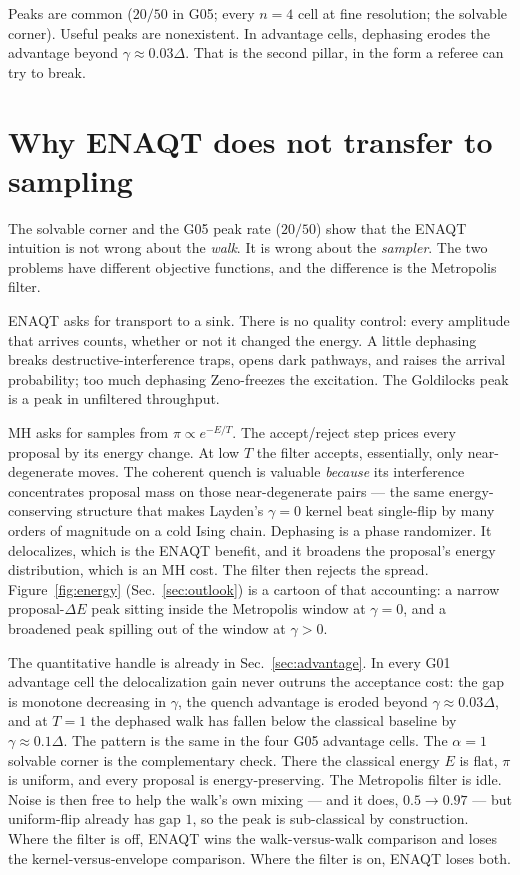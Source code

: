 \documentclass[aps,prx,reprint,floatfix,amsmath,amssymb,amsfonts]{revtex4-2}
\begin{document}
Peaks are common ($20/50$ in G05; every $n=4$ cell at fine resolution;
the solvable corner). Useful peaks are nonexistent. In advantage cells,
dephasing erodes the advantage beyond $\gamma\approx 0.03\Delta$. That
is the second pillar, in the form a referee can try to break.

\section{Why ENAQT does not transfer to sampling}
\label{sec:mechanism}

The solvable corner and the G05 peak rate ($20/50$) show that the ENAQT
intuition is not wrong about the \emph{walk}. It is wrong about the
\emph{sampler}. The two problems have different objective functions, and
the difference is the Metropolis filter.

ENAQT asks for transport to a sink. There is no quality control: every
amplitude that arrives counts, whether or not it changed the energy. A
little dephasing breaks destructive-interference traps, opens dark
pathways, and raises the arrival probability; too much dephasing
Zeno-freezes the excitation. The Goldilocks peak is a peak in unfiltered
throughput.

MH asks for samples from $\pi \propto e^{-E/T}$. The accept/reject step
prices every proposal by its energy change. At low $T$ the filter
accepts, essentially, only near-degenerate moves. The coherent quench is
valuable \emph{because} its interference concentrates proposal mass on
those near-degenerate pairs --- the same energy-conserving structure
that makes Layden's $\gamma=0$ kernel beat single-flip by many orders of
magnitude on a cold Ising chain. Dephasing is a phase randomizer. It
delocalizes, which is the ENAQT benefit, and it broadens the proposal's
energy distribution, which is an MH cost. The filter then rejects the
spread. Figure~\ref{fig:energy} (Sec.~\ref{sec:outlook}) is a cartoon of
that accounting: a narrow proposal-$\Delta E$ peak sitting inside the
Metropolis window at $\gamma=0$, and a broadened peak spilling out of
the window at $\gamma>0$.

The quantitative handle is already in Sec.~\ref{sec:advantage}. In every
G01 advantage cell the delocalization gain never outruns the acceptance
cost: the gap is monotone decreasing in $\gamma$, the quench advantage
is eroded beyond $\gamma\approx 0.03\Delta$, and at $T=1$ the dephased
walk has fallen below the classical baseline by $\gamma\approx 0.1\Delta$.
The pattern is the same in the four G05 advantage cells. The $\alpha=1$
solvable corner is the complementary check. There the classical energy
$E$ is flat, $\pi$ is uniform, and every proposal is energy-preserving.
The Metropolis filter is idle. Noise is then free to help the walk's own
mixing --- and it does, $0.5\to 0.97$ --- but uniform-flip already has
gap $1$, so the peak is sub-classical by construction. Where the filter
is off, ENAQT wins the walk-versus-walk comparison and loses the
kernel-versus-envelope comparison. Where the filter is on, ENAQT loses
both.
\end{document}
